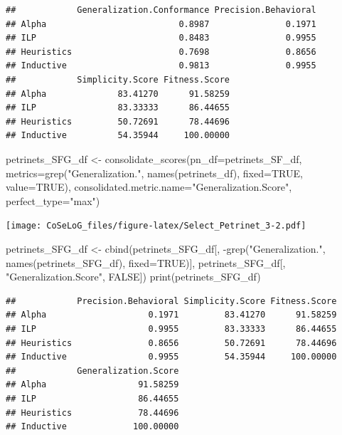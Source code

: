 \documentclass[]{article}
\newenvironment{Shaded}{\begin{snugshade}}{\end{snugshade}}
\newcommand{\KeywordTok}[1]{\textcolor[rgb]{0.94,0.87,0.69}{{#1}}}
\newcommand{\DataTypeTok}[1]{\textcolor[rgb]{0.87,0.87,0.75}{{#1}}}
\newcommand{\StringTok}[1]{\textcolor[rgb]{0.80,0.58,0.58}{{#1}}}
\newcommand{\OtherTok}[1]{\textcolor[rgb]{0.94,0.94,0.56}{{#1}}}
\newcommand{\NormalTok}[1]{\textcolor[rgb]{0.80,0.80,0.80}{{#1}}}
\begin{document}
\begin{verbatim}
##            Generalization.Conformance Precision.Behavioral
## Alpha                          0.8987               0.1971
## ILP                            0.8483               0.9955
## Heuristics                     0.7698               0.8656
## Inductive                      0.9813               0.9955
##            Simplicity.Score Fitness.Score
## Alpha              83.41270      91.58259
## ILP                83.33333      86.44655
## Heuristics         50.72691      78.44696
## Inductive          54.35944     100.00000
\end{verbatim}

\begin{Shaded}
\begin{Highlighting}[]
\NormalTok{petrinets_SFG_df <-}\StringTok{ }\KeywordTok{consolidate_scores}\NormalTok{(}\DataTypeTok{pn_df=}\NormalTok{petrinets_SF_df, }
        \DataTypeTok{metrics=}\KeywordTok{grep}\NormalTok{(}\StringTok{"Generalization."}\NormalTok{, }\KeywordTok{names}\NormalTok{(petrinets_df), }\DataTypeTok{fixed=}\OtherTok{TRUE}\NormalTok{, }\DataTypeTok{value=}\OtherTok{TRUE}\NormalTok{), }
        \DataTypeTok{consolidated.metric.name=}\StringTok{"Generalization.Score"}\NormalTok{,}
        \DataTypeTok{perfect_type=}\StringTok{"max"}\NormalTok{)}
\end{Highlighting}
\end{Shaded}

\texttt{[image: CoSeLoG\_files/figure-latex/Select\_Petrinet\_3-2.pdf]}

\begin{Shaded}
\begin{Highlighting}[]
\NormalTok{petrinets_SFG_df <-}\StringTok{ }\KeywordTok{cbind}\NormalTok{(petrinets_SFG_df[, }
            \NormalTok{-}\KeywordTok{grep}\NormalTok{(}\StringTok{"Generalization."}\NormalTok{, }\KeywordTok{names}\NormalTok{(petrinets_SFG_df), }\DataTypeTok{fixed=}\OtherTok{TRUE}\NormalTok{)],}
            \NormalTok{petrinets_SFG_df[, }\StringTok{"Generalization.Score"}\NormalTok{, }\OtherTok{FALSE}\NormalTok{])}
\KeywordTok{print}\NormalTok{(petrinets_SFG_df)}
\end{Highlighting}
\end{Shaded}

\begin{verbatim}
##            Precision.Behavioral Simplicity.Score Fitness.Score
## Alpha                    0.1971         83.41270      91.58259
## ILP                      0.9955         83.33333      86.44655
## Heuristics               0.8656         50.72691      78.44696
## Inductive                0.9955         54.35944     100.00000
##            Generalization.Score
## Alpha                  91.58259
## ILP                    86.44655
## Heuristics             78.44696
## Inductive             100.00000
\end{verbatim}
\end{document}
